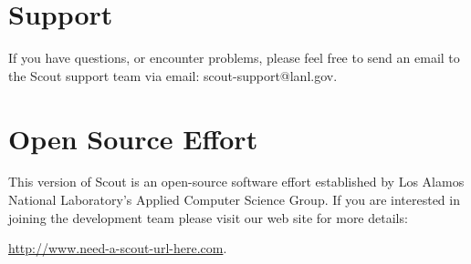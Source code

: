 \section*{Support}
If you have questions, or encounter problems, please feel free to send an email
to the Scout support team via email: {\color{scoutblue}scout-support@lanl.gov}.

\section*{Open Source Effort}
This version of Scout is an open-source software effort established by Los Alamos
National Laboratory's Applied Computer Science Group.  If you are interested in 
joining the development team please visit our web site for more details:
\begin{center} 
	{\color{scoutblue}\url{http://www.need-a-scout-url-here.com}}.
\end{center}






